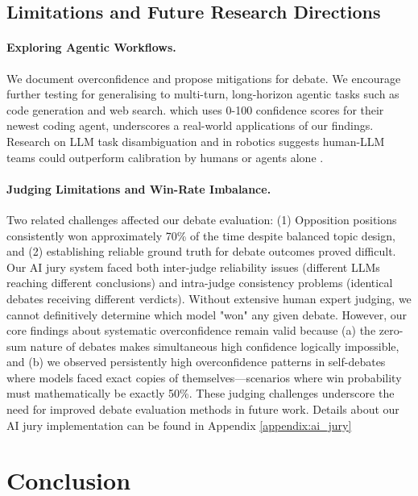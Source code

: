 \documentclass{article}
\begin{document}
\subsection{Limitations and Future Research Directions}
\label{subsec:limitations_future}

\paragraph{Exploring Agentic Workflows.} We document overconfidence and propose mitigations for debate. We encourage further testing for generalising to multi-turn, long-horizon agentic tasks such as code generation and web search. \citet{cognitionlabs_devin21_2025} which uses 0-100 confidence scores for their newest coding agent, underscores a real-world applications of our findings. Research on LLM task disambiguation \citep{hu2024uncertaintythoughtsuncertaintyawareplanning,kobalczyk2025activetaskdisambiguationllms} and in robotics \citep{liang2025introspectiveplanningaligningrobots,ren2023robotsaskhelpuncertainty} suggests human-LLM teams could outperform calibration by humans or agents alone \citep{roldan2025genai}.

\paragraph{Judging Limitations and Win-Rate Imbalance.} Two related challenges affected our debate evaluation: (1) Opposition positions consistently won approximately 70\% of the time despite balanced topic design, and (2) establishing reliable ground truth for debate outcomes proved difficult. Our AI jury system faced both inter-judge reliability issues (different LLMs reaching different conclusions) and intra-judge consistency problems (identical debates receiving different verdicts). Without extensive human expert judging, we cannot definitively determine which model "won" any given debate. However, our core findings about systematic overconfidence remain valid because (a) the zero-sum nature of debates makes simultaneous high confidence logically impossible, and (b) we observed persistently high overconfidence patterns in self-debates where models faced exact copies of themselves—scenarios where win probability must mathematically be exactly 50\%. These judging challenges underscore the need for improved debate evaluation methods in future work. Details about our AI jury implementation can be found in Appendix \ref{appendix:ai_jury}

\section{Conclusion}
\end{document}
